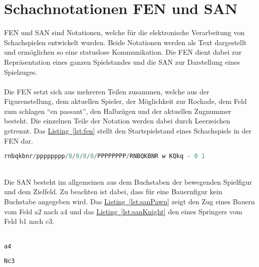 \section{Schachnotationen FEN und SAN}\label{sec:chessNotation}
\gls{FEN} und \gls{SAN} sind Notationen, welche für die elektronische Verarbeitung von Schachspielen entwickelt wurden. Beide Notationen werden als Text dargestellt und ermöglichen so eine statuslose Kommunikation. Die \gls{FEN} dient dabei zur Repräsentation eines ganzen Spielstandes und die \gls{SAN} zur Darstellung eines Spielzuges.\\
\\
Die \gls{FEN} setzt sich aus mehreren Teilen zusammen, welche aus der Figurenstellung, dem aktuellen Spieler, der Möglichkeit zur Rochade, dem Feld zum schlagen \enquote{en passant}, den Halbzügen und der aktuellen Zugnummer besteht. Die einzelnen Teile der Notation werden dabei durch Leerzeichen getrennt. Das \hyperref[lst:fen]{Listing~\ref{lst:fen}} stellt den Startspielstand eines Schachspiels in der \gls{FEN} dar.\\
\begin{lstlisting}[style=lstStyleFramed, language=Kotlin, caption={Startposition eines Schachspiels in der FEN}, label=lst:fen, float]
rnbqkbnr/pppppppp/8/8/8/8/PPPPPPPP/RNBQKBNR w KQkq - 0 1
\end{lstlisting}
\\
Die \gls{SAN} besteht im allgemeinen aus dem Buchstaben der bewegenden Spielfigur und dem Zielfeld. Zu beachten ist dabei, dass für eine Bauernfigur kein Buchstabe angegeben wird. Das \hyperref[lst:sanPawn]{Listing~\ref{lst:sanPawn}} zeigt den Zug eines Bauern vom Feld a2 nach a4 und das \hyperref[lst:sanKnight]{Listing~\ref{lst:sanKnight}} den eines Springers vom Feld b1 nach c3.\\
\\
\begin{minipage}{.45\textwidth}
\begin{lstlisting}[style=lstStyleFramed, language=Kotlin, caption={Beispiel SAN: Bauer zieht von a2 nach a4}, label=lst:sanPawn]
a4
\end{lstlisting}
\end{minipage}\hfill
\begin{minipage}{.45\textwidth}
\begin{lstlisting}[style=lstStyleFramed, language=Kotlin, caption={Beispiel SAN: Spring zieht von b1 nach c3}, label=lst:sanKnight]
Nc3
\end{lstlisting}
\end{minipage}
